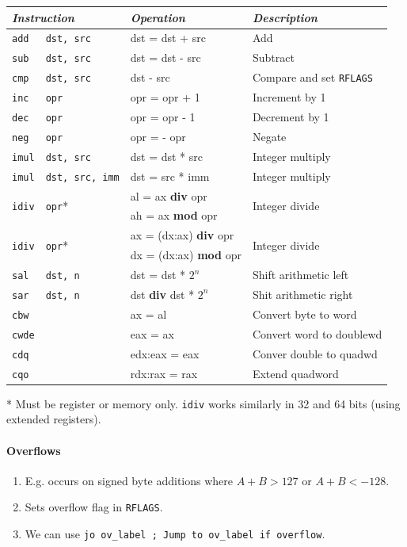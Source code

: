 \documentclass[twocolumn,english]{article}
\providecommand{\tabularnewline}{\\}
\begin{document}
\begin{table}[H]
\noindent \centering{}\texttt{\footnotesize{}}%
\begin{tabular}{llll}
\toprule 
\multicolumn{2}{l}{\emph{Instruction}} & \emph{Operation} & \emph{Description}\tabularnewline
\midrule
\texttt{add} & \texttt{dst, src} & dst = dst + src & Add\tabularnewline
\texttt{sub} & \texttt{dst, src} & dst = dst - src & Subtract\tabularnewline
\texttt{cmp} & \texttt{dst, src} & dst - src & Compare and set \texttt{RFLAGS}\tabularnewline
\texttt{inc} & \texttt{opr} & opr = opr + 1 & Increment by 1\tabularnewline
\texttt{dec} & \texttt{opr} & opr = opr - 1 & Decrement by 1\tabularnewline
\texttt{neg} & \texttt{opr} & opr = - opr & Negate\tabularnewline
\texttt{imul} & \texttt{dst, src} & dst = dst {*} src & Integer multiply\tabularnewline
\texttt{imul} & \texttt{dst, src, imm} & dst = src {*} imm & Integer multiply\tabularnewline
\multirow{2}{*}{\texttt{idiv}} & \multirow{2}{*}{\texttt{opr}{*}} & al = ax \textbf{div} opr & \multirow{2}{*}{Integer divide}\tabularnewline
 &  & ah = ax \textbf{mod} opr & \tabularnewline
\multirow{2}{*}{\texttt{idiv}} & \multirow{2}{*}{\texttt{opr}{*}} & ax = (dx:ax) \textbf{div} opr & \multirow{2}{*}{Integer divide}\tabularnewline
 &  & dx = (dx:ax) \textbf{mod} opr & \tabularnewline
\texttt{sal} & \texttt{dst, n} & dst = dst {*} $2^{n}$ & Shift arithmetic left\tabularnewline
\texttt{sar} & \texttt{dst, n} & dst \textbf{div} dst {*} $2^{n}$ & Shit arithmetic right\tabularnewline
\texttt{cbw} &  & ax = al & Convert byte to word\tabularnewline
\texttt{cwde} &  & eax = ax & Convert word to doublewd\tabularnewline
\texttt{cdq} &  & edx:eax = eax & Conver double to quadwd\tabularnewline
\texttt{cqo} &  & rdx:rax = rax & Extend quadword\tabularnewline
\bottomrule
\end{tabular}
\end{table}


{*} Must be register or memory only. \texttt{idiv} works similarly
in 32 and 64 bits (using extended registers).


\paragraph{Overflows}
\begin{enumerate}
\item E.g. occurs on signed byte additions where $A+B>127$ or $A+B<-128$. 
\item Sets overflow flag in \texttt{RFLAGS}.
\item We can use \texttt{jo ov\_label ; Jump to ov\_label if overflow}.
\end{enumerate}
\end{document}
